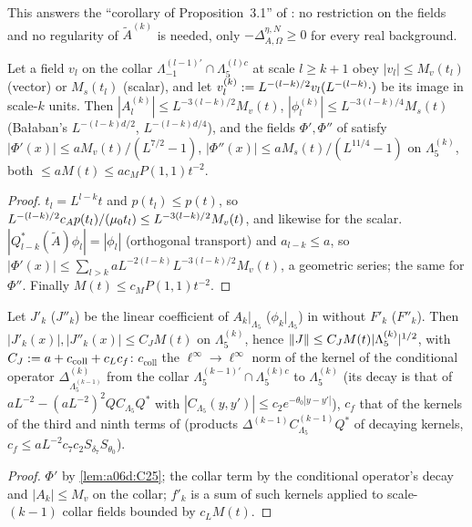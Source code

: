 This answers the ``corollary of Proposition~3.1'' of \cite[p.~586]{Ba2}: no restriction on the fields and no regularity of $\tilde A^{(k)}$ is needed, only $-\Delta^{\eta,N}_{A,\Omega}\ge0$ for every real background.

\begin{lemma}[{\cite[(3.15), (3.16)]{Ba2}}]\label{lem:a06d:C25}
Let a field $v_l$ on the collar $\Lambda^{(l-1)'}_{-1}\cap\Lambda^{(l)c}_5$ at scale $l\ge k+1$ obey $|v_l|\le M_v(t_l)$ (vector) or $M_s(t_l)$ (scalar), and let $v^{(k)}_l:= L^{-(l-k)/2}v_l(L^{-(l-k)}\cdot)$ be its image in scale-$k$ units. Then $|A^{(k)}_l|\le L^{-3(l-k)/2}M_v(t)$, $|\phi^{(k)}_l|\le L^{-3(l-k)/4}M_s(t)$ (Ba{\l}aban's $L^{-(l-k)d/2}$, $L^{-(l-k)d/4}$), and the fields $\Phi',\Phi''$ of \cite[(3.13)--(3.14)]{Ba2} satisfy $|\Phi'(x)|\le aM_v(t)/(L^{7/2}-1)$, $|\Phi''(x)|\le aM_s(t)/(L^{11/4}-1)$ on $\Lambda^{(k)}_5$, both $\le aM(t)\le ac_MP(1,1)t^{-2}$.
\end{lemma}

\begin{proof}
$t_l=L^{l-k}t$ and $p(t_l)\le p(t)$, so $L^{-(l-k)/2}c_Ap(t_l)/(\mu_0 t_l)\le L^{-3(l-k)/2}M_v(t)$, and likewise for the scalar. $|Q^*_{l-k}(\tilde A)\phi_l|=|\phi_l|$ (orthogonal transport) and $a_{l-k}\le a$, so $|\Phi'(x)|\le\sum_{l>k}aL^{-2(l-k)}L^{-3(l-k)/2}M_v(t)$, a geometric series; the same for $\Phi''$. Finally $M(t)\le c_MP(1,1)t^{-2}$.
\end{proof}

\begin{lemma}\label{lem:a06d:C26}
Let $J'_k$ ($J''_k$) be the linear coefficient of $A_k|_{\Lambda_5}$ ($\phi_k|_{\Lambda_5}$) in \cite[(3.9)]{Ba2} without $F'_k$ ($F''_k$). Then $|J'_k(x)|,|J''_k(x)|\le C_JM(t)$ on $\Lambda^{(k)}_5$, hence $\lVert J\rVert\le C_JM(t)|\Lambda^{(k)}_5|^{1/2}$, with $C_J:= a+c_{\mathrm{coll}}+c_Lc_f$: $c_{\mathrm{coll}}$ the $\ell^\infty\to\ell^\infty$ norm of the kernel of the conditional operator $\Delta^{(k)}_{\Lambda^{(k-1)}_5}$ from the collar $\Lambda^{(k-1)'}_5\cap\Lambda^{(k)c}_5$ to $\Lambda^{(k)}_5$ (its decay is that of $aL^{-2}-(aL^{-2})^2QC_{\Lambda_5}Q^*$ with $|C_{\Lambda_5}(y,y')|\le c_2e^{-\theta_0|y-y'|}$), $c_f$ that of the kernels of the third and ninth terms of \cite[(2.46)]{Ba2} (products $\Delta^{(k-1)}C^{(k-1)}_{\Lambda_5}Q^*$ of decaying kernels, $c_f\le aL^{-2}c_7c_2S_{\delta_7}S_{\theta_0}$).
\end{lemma}

\begin{proof}
$\Phi'$ by \cref{lem:a06d:C25}; the collar term by the conditional operator's decay and $|A_k|\le M_v$ on the collar; $f'_k$ is a sum of such kernels applied to scale-$(k-1)$ collar fields bounded by $c_LM(t)$.
\end{proof}

